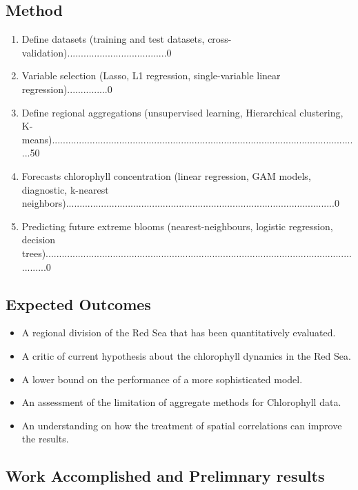 \subsection{Method}

\begin{enumerate}
\item Define datasets (training and test datasets, cross-validation).....................................0%
\item Variable selection (Lasso, L1 regression, single-variable linear regression)...............0%
\item Define regional aggregations (unsupervised learning, Hierarchical clustering, K-means)...................................................................................................................50%
\item Forecasts chlorophyll concentration (linear regression, GAM models, diagnostic, k-nearest neighbors)....................................................................................................0%
\item Predicting future extreme blooms (nearest-neighbours, logistic regression, decision trees)...........................................................................................................................0%
\end{enumerate}

\subsection{Expected Outcomes}

\begin{itemize}
\item A regional division of the Red Sea that has been quantitatively evaluated.
\item A critic of current hypothesis about the chlorophyll dynamics in the Red Sea.
\item A lower bound on the performance of a more sophisticated model.
\item An assessment of the limitation of aggregate methods for Chlorophyll data.
\item An understanding on how the treatment of spatial correlations can improve the results.
\end{itemize}

\subsection{Work Accomplished and Prelimnary results}
